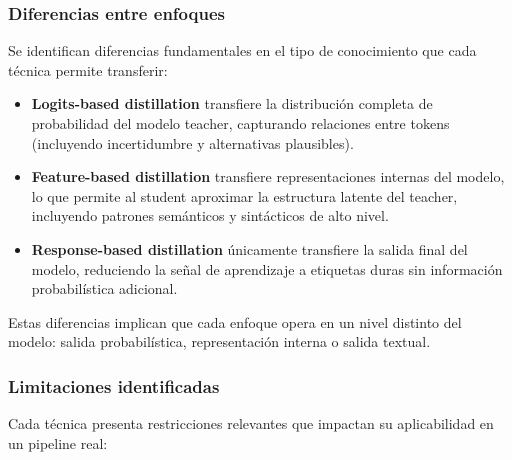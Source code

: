 \documentclass[12pt]{article}
\begin{document}
	\subsubsection{Diferencias entre enfoques}
	
	Se identifican diferencias fundamentales en el tipo de conocimiento que cada técnica permite transferir:
	
	\begin{itemize}
		\item \textbf{Logits-based distillation} transfiere la distribución completa de probabilidad del modelo teacher, capturando relaciones entre tokens (incluyendo incertidumbre y alternativas plausibles).
		
		\item \textbf{Feature-based distillation} transfiere representaciones internas del modelo, lo que permite al student aproximar la estructura latente del teacher, incluyendo patrones semánticos y sintácticos de alto nivel.
		
		\item \textbf{Response-based distillation} únicamente transfiere la salida final del modelo, reduciendo la señal de aprendizaje a etiquetas duras sin información probabilística adicional.
	\end{itemize}
	
	Estas diferencias implican que cada enfoque opera en un nivel distinto del modelo: salida probabilística, representación interna o salida textual.
	
	\subsubsection{Limitaciones identificadas}
	
	Cada técnica presenta restricciones relevantes que impactan su aplicabilidad en un pipeline real:
	
\end{document}
